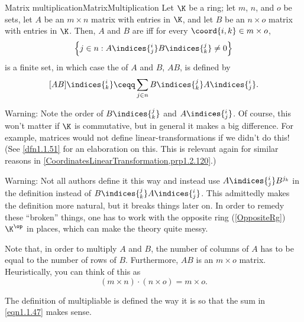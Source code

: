 \begin{dfn}{Matrix multiplication}{MatrixMultiplication}
	Let $\K$ be a ring; let $m$, $n$, and $o$ be sets, let $A$ be an $m\times n$ matrix with entries in $\K$, and let $B$ be an $n\times o$ matrix with entries in $\K$.  Then, $A$ and $B$ are  iff for every $\coord{i,k}\in m\times o$,
	\begin{equation}
	\left\{ j\in n:A\indices{^i_j}B\indices{^j_k}\neq 0\right\}
	\end{equation}
	is a finite set, in which case the  of $A$ and $B$, $AB$, is defined by
	\begin{equation}\label{eqn1.1.47}
	[AB]\indices{^i_k}\ceqq \sum _{j\in n}B\indices{^j_k}A\indices{^i_j}.
	\end{equation}
	\begin{rmk}
		Warning:  Note the order of $B\indices{^j_k}$ and $A\indices{^i_j}$.  Of course, this won't matter if $\K$ is commutative, but in general it makes a big difference.  For example, matrices would not define linear-transformations if we didn't do this!  (See \cref{dfn1.1.51} for an elaboration on this.  This is relevant again for similar reasons in \cref{CoordinatesLinearTransformation,prp1.2.120}.)
	\end{rmk}
	\begin{rmk}
		Warning:  Not all authors define it this way and instead use $A\indices{^i_j}B^{j_k}$ in the definition instead of $B\indices{^j_k}A\indices{^i_j}$.  This admittedly makes the definition more natural, but it breaks things later on.  In order to remedy these ``broken'' things, one has to work with the opposite ring (\cref{OppositeRg}) $\K ^{\op}$ in places, which can make the theory quite messy.
	\end{rmk}
	\begin{rmk}
		Note that, in order to multiply $A$ and $B$, the number of columns of $A$ has to be equal to the number of rows of $B$.  Furthermore, $AB$ is an $m\times o$ matrix.  Heuristically, you can think of this as
		\begin{equation}
		(m\times n)\cdot (n\times o)=m\times o.
		\end{equation}
	\end{rmk}
	\begin{rmk}
		The definition of multipliable is defined the way it is so that the sum in \eqref{eqn1.1.47} makes sense.
	\end{rmk}
	\begin{rmk}

\end{rmk}
\end{dfn}
